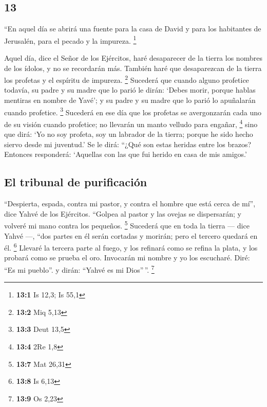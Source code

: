 \begin{paracol}{2}
\hypertarget{section-24}{%
\section{13}\label{section-24}}

 ``En aquel día se abrirá una fuente para la casa de David
y para los habitantes de Jerusalén, para el pecado y la impureza.
\footnote{\textbf{13:1} Is 12,3; Is 55,1}

 Aquel día, dice el Señor de los Ejércitos, haré
desaparecer de la tierra los nombres de los ídolos, y no se recordarán
más. También haré que desaparezcan de la tierra los profetas y el
espíritu de impureza. \footnote{\textbf{13:2} Miq 5,13} 
Sucederá que cuando alguno profetice todavía, su padre y su madre que lo
parió le dirán: `Debes morir, porque hablas mentiras en nombre de Yavé';
y su padre y su madre que lo parió lo apuñalarán cuando profetice.
\footnote{\textbf{13:3} Deut 13,5}  Sucederá en ese día
que los profetas se avergonzarán cada uno de su visión cuando profetice;
no llevarán un manto velludo para engañar, \footnote{\textbf{13:4} 2Re
  1,8}  sino que dirá: `Yo no soy profeta, soy un labrador
de la tierra; porque he sido hecho siervo desde mi juventud.'
 Se le dirá: ``¿Qué son estas heridas entre los brazos?
Entonces responderá: `Aquellas con las que fui herido en casa de mis
amigos.'

\hypertarget{el-tribunal-de-purificaciuxf3n}{%
\subsection{El tribunal de
purificación}\label{el-tribunal-de-purificaciuxf3n}}

 ``Despierta, espada, contra mi pastor, y contra el hombre
que está cerca de mí'', dice Yahvé de los Ejércitos. ``Golpea al pastor
y las ovejas se dispersarán; y volveré mi mano contra los pequeños.
\footnote{\textbf{13:7} Mat 26,31}  Sucederá que en toda
la tierra --- dice Yahvé ---, ``dos partes en él serán cortadas y
morirán; pero el tercero quedará en él. \footnote{\textbf{13:8} Is 6,13}
 Llevaré la tercera parte al fuego, y los refinará como se
refina la plata, y los probará como se prueba el oro. Invocarán mi
nombre y yo los escucharé. Diré: ``Es mi pueblo''. y dirán: ``Yahvé es
mi Dios''\,''. \footnote{\textbf{13:9} Os 2,23}

\switchcolumn
\begin{otherlanguage}{english}


\end{otherlanguage}
\end{paracol}
